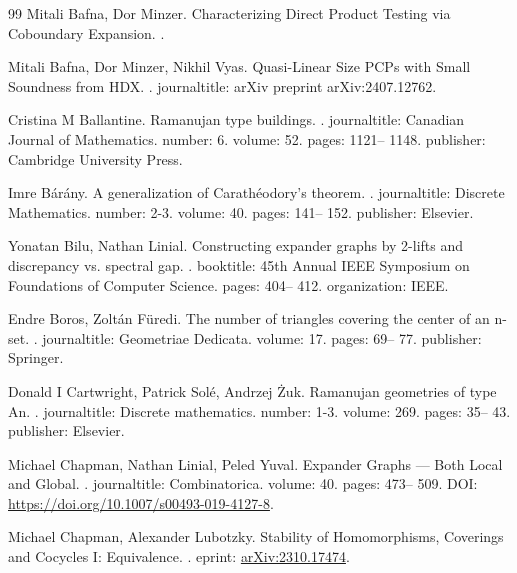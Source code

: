 \begin{thebibliography}{99}
Mitali Bafna, Dor Minzer.
\newblock Characterizing Direct Product Testing via Coboundary Expansion.
.

Mitali Bafna, Dor Minzer, Nikhil Vyas.
\newblock Quasi-Linear Size PCPs with Small Soundness from HDX.
.
\newblock journaltitle: arXiv preprint arXiv:2407.12762.

Cristina M Ballantine.
\newblock Ramanujan type buildings.
.
\newblock journaltitle: Canadian Journal of Mathematics.
\newblock number: 6.
\newblock volume: 52.
\newblock pages: 1121-- 1148.
\newblock publisher: Cambridge University Press.

Imre Bárány.
\newblock A generalization of Carathéodory's theorem.
.
\newblock journaltitle: Discrete Mathematics.
\newblock number: 2-3.
\newblock volume: 40.
\newblock pages: 141-- 152.
\newblock publisher: Elsevier.

Yonatan Bilu, Nathan Linial.
\newblock Constructing expander graphs by 2-lifts and discrepancy vs. spectral gap.
.
\newblock booktitle: 45th Annual IEEE Symposium on Foundations of Computer Science.
\newblock pages: 404-- 412.
\newblock organization: IEEE.

Endre Boros, Zoltán Füredi.
\newblock The number of triangles covering the center of an n-set.
.
\newblock journaltitle: Geometriae Dedicata.
\newblock volume: 17.
\newblock pages: 69-- 77.
\newblock publisher: Springer.

Donald I Cartwright, Patrick Solé, Andrzej Żuk.
\newblock Ramanujan geometries of type An.
.
\newblock journaltitle: Discrete mathematics.
\newblock number: 1-3.
\newblock volume: 269.
\newblock pages: 35-- 43.
\newblock publisher: Elsevier.

Michael Chapman, Nathan Linial, Peled Yuval.
\newblock Expander Graphs — Both Local and Global.
.
\newblock journaltitle: Combinatorica.
\newblock volume: 40.
\newblock pages: 473-- 509.
\newblock DOI: \url{https://doi.org/10.1007/s00493-019-4127-8}.

Michael Chapman, Alexander Lubotzky.
\newblock Stability of Homomorphisms, Coverings and Cocycles I: Equivalence.
.
\newblock eprint: \url{arXiv:2310.17474}.


\end{thebibliography}
